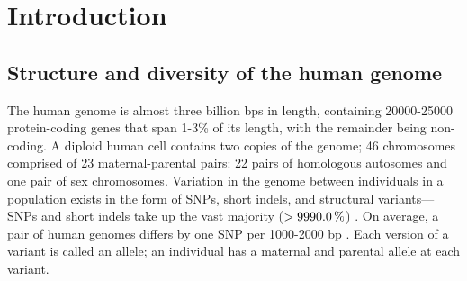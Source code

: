 %
%


\chapter{Introduction}

\begin{outline}

\section{Structure and diversity of the human genome}

\1 The human genome is almost three billion \glspl{bp} in length, 
containing 20000-25000 protein-coding genes \autocite{theencodeprojectconsortium2012IntegratedEncyclopediaDNA,1000genomesprojectconsortium2015GlobalReferenceHuman} that span 1-3\% of its length, 
with the remainder being non-coding.
A diploid human cell contains two copies of the genome; 46 chromosomes comprised of 23 maternal-parental pairs: 22 pairs of homologous autosomes and one pair of sex chromosomes.
%
\1 Variation in the genome between individuals in a population exists in the form of \glspl{SNP}, short indels, and structural variants---\glspl{SNP} and short indels take up the vast majority ($> \percentage{99.9}$) \autocite{1000genomesprojectconsortium2015GlobalReferenceHuman}.
On average, a pair of human genomes differs by one \gls{SNP} per 1000-2000 \gls{bp} \autocite{theinternationalsnpmapworkinggroup2001MapHumanGenome}.
Each version of a variant is called an allele; an individual has a maternal and parental allele at each variant.


\end{outline}
